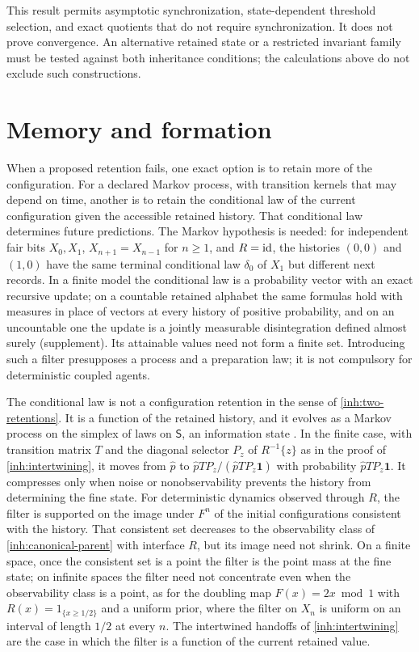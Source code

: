 This result permits asymptotic synchronization, state-dependent threshold
selection, and exact quotients that do not require synchronization. It
does not prove convergence. An alternative retained state or a restricted
invariant family must be tested against both inheritance conditions;
the calculations above do not exclude such constructions.


\section{Memory and formation}

When a proposed retention fails, one exact option is to retain more of the
configuration. For a declared Markov process, with transition kernels that
may depend on time, another is to retain the conditional law of the current
configuration given the accessible retained history. That conditional law
determines future predictions. The Markov hypothesis is needed: for
independent fair bits $X_0,X_1$, $X_{n+1}=X_{n-1}$ for $n\geq1$, and
$R=\mathrm{id}$, the histories $(0,0)$ and $(1,0)$ have the same terminal
conditional law $\delta_0$ of $X_1$ but different next records. In a finite
model the conditional law is a probability vector with an exact recursive
update; on a countable retained alphabet the same formulas hold with
measures in place of vectors at every history of positive probability, and
on an uncountable one the update is a jointly measurable disintegration
defined almost surely (supplement). Its attainable values need not form a
finite set. Introducing such a filter presupposes a process and a
preparation law; it is not compulsory for deterministic coupled agents.

The conditional law is not a configuration retention in the sense of
\cref{inh:two-retentions}. It is a function of the retained history, and it
evolves as a Markov process on the simplex of laws on $\mathsf S$, an
information state \citep{Astrom1965}. In the finite case, with transition
matrix $T$ and the diagonal selector $P_z$ of $R^{-1}\{z\}$ as in the proof
of \cref{inh:intertwining}, it moves from $\widehat p$ to
$\widehat pTP_z/(\widehat pTP_z\mathbf 1)$ with probability
$\widehat pTP_z\mathbf 1$. It compresses only when noise or
nonobservability prevents the history from determining the fine state. For
deterministic dynamics observed through $R$, the filter is supported on the
image under $F^n$ of the initial configurations consistent with the history.
That consistent set decreases to the observability class of
\cref{inh:canonical-parent} with interface $R$, but its image need not
shrink. On a finite space, once the consistent set is a point the filter is
the point mass at the fine state; on infinite spaces the filter need not
concentrate even when the observability class is a point, as for the
doubling map $F(x)=2x\bmod1$ with $R(x)=1_{\{x\geq1/2\}}$ and a uniform
prior, where the filter on $X_n$ is uniform on an interval of length $1/2$
at every $n$. The intertwined handoffs of
\cref{inh:intertwining} are the case in which the filter is a function of the
current retained value.

